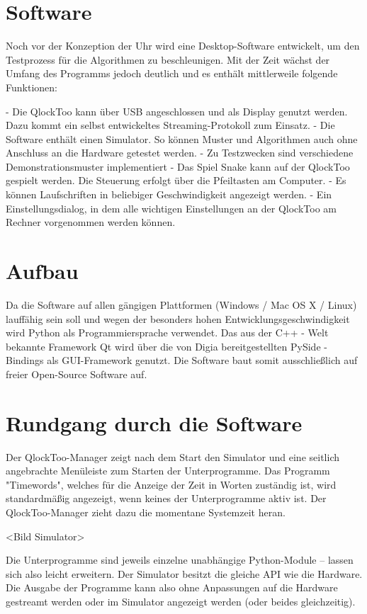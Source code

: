 
\section{Software}
\label{sec:Software}
Noch vor der Konzeption der Uhr wird eine Desktop-Software entwickelt, um den Testprozess für die Algorithmen zu beschleunigen. Mit der Zeit wächst der Umfang des Programms jedoch deutlich und es enthält mittlerweile folgende Funktionen:

- Die QlockToo kann über USB angeschlossen und als Display genutzt werden. Dazu kommt ein selbst entwickeltes Streaming-Protokoll zum Einsatz.
- Die Software enthält einen Simulator. So können Muster und Algorithmen auch ohne Anschluss an die Hardware getestet werden.
- Zu Testzwecken sind verschiedene Demonstrationsmuster implementiert
- Das Spiel Snake kann auf der QlockToo gespielt werden. Die Steuerung erfolgt über die Pfeiltasten am Computer.
- Es können Laufschriften in beliebiger Geschwindigkeit angezeigt werden.
- Ein Einstellungsdialog, in dem alle wichtigen Einstellungen an der QlockToo am Rechner vorgenommen werden können.

\section{Aufbau}
Da die Software auf allen gängigen Plattformen (Windows / Mac OS X / Linux) lauffähig sein soll und wegen der besonders hohen Entwicklungsgeschwindigkeit wird Python als Programmiersprache verwendet.
Das aus der C++ - Welt bekannte Framework Qt wird über die von Digia bereitgestellten PySide -Bindings als GUI-Framework genutzt. Die Software baut somit ausschließlich auf freier Open-Source Software auf.

\section{Rundgang durch die Software}
Der QlockToo-Manager zeigt nach dem Start den Simulator und eine seitlich angebrachte Menüleiste zum Starten der Unterprogramme.
Das Programm "Timewords", welches für die Anzeige der Zeit in Worten zuständig ist, wird standardmäßig angezeigt, wenn keines der Unterprogramme aktiv ist. Der QlockToo-Manager zieht dazu die momentane Systemzeit heran.

<Bild Simulator>

Die Unterprogramme sind jeweils einzelne unabhängige Python-Module -- lassen sich also leicht erweitern.
Der Simulator besitzt die gleiche API wie die Hardware. Die Ausgabe der Programme kann also ohne Anpassungen auf die Hardware gestreamt werden oder im Simulator angezeigt werden (oder beides gleichzeitig).

